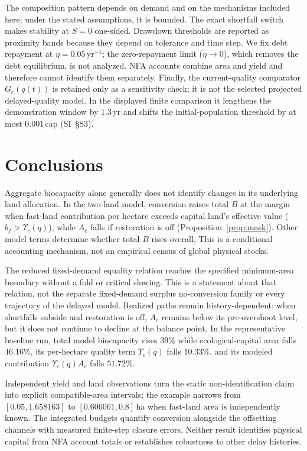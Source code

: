 \documentclass[preprint,12pt,authoryear]{elsarticle}
\newcommand{\Ups}{\Upsilon_c}
\begin{document}
The composition pattern depends on demand and on the mechanisms included here; under the stated assumptions, it is bounded. The exact shortfall switch makes stability at $S=0$ one-sided. Drawdown thresholds are reported as proximity bands because they depend on tolerance and time step. We fix debt repayment at $\eta=0.05$\,yr$^{-1}$; the zero-repayment limit ($\eta\to0$), which removes the debt equilibrium, is not analyzed. NFA accounts combine area and yield and therefore cannot identify them separately. Finally, the current-quality comparator $G_c(q(t))$ is retained only as a sensitivity check; it is not the selected projected delayed-quality model. In the displayed finite comparison it lengthens the demonstration window by $1.3$\,yr and shifts the initial-population threshold by at most $0.001$\,cap (SI~\S S3).

\section{Conclusions}\label{sec:conclusions}

Aggregate biocapacity alone generally does not identify changes in its underlying land allocation. In the two-land model, conversion raises total $B$ at the margin when fast-land contribution per hectare exceeds capital land's effective value ($b_f>\Ups(q)$), while $A_c$ falls if restoration is off (Proposition~\ref{prop:mask}). Other model terms determine whether total $B$ rises overall. This is a conditional accounting mechanism, not an empirical census of global physical stocks.

The reduced fixed-demand equality relation reaches the specified minimum-area boundary without a fold or critical slowing. This is a statement about that relation, not the separate fixed-demand surplus no-conversion family or every trajectory of the delayed model. Realized paths remain history-dependent: when shortfalls subside and restoration is off, $A_c$ remains below its pre-overshoot level, but it does not continue to decline at the balance point. In the representative baseline run, total model biocapacity rises $39\%$ while ecological-capital area falls $46.16\%$, its per-hectare quality term $\Ups(q)$ falls $10.33\%$, and its modeled contribution $\Ups(q)A_c$ falls $51.72\%$.

Independent yield and land observations turn the static non-identification claim into explicit compatible-area intervals; the example narrows from $[0.05,1.658163]$ to $[0.606061,0.8]$\,ha when fast-land area is independently known. The integrated budgets quantify conversion alongside the offsetting channels with measured finite-step closure errors. Neither result identifies physical capital from NFA account totals or establishes robustness to other delay histories.
\end{document}
